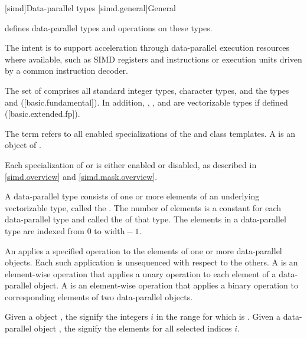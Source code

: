 [simd]{Data-parallel types}
[simd.general]{General}

\pnum
[simd] defines data-parallel types and operations on these types.
\begin{note}
The intent is to support acceleration through data-parallel execution resources
where available, such as SIMD registers and instructions or execution units
driven by a common instruction decoder.
\end{note}

\pnum\label{wording.vectorizable.types}%
The set of  comprises all standard integer types,
character types, and the types  and 
([basic.fundamental]).
In addition, , , and
 are vectorizable types if defined ([basic.extended.fp]).

\pnum
The term  refers to all enabled specializations of
the  and  class templates. A  is
an object of .

\pnum
Each specialization of  or  is either enabled or disabled,
as described in \ref{simd.overview} and \ref{simd.mask.overview}.

\pnum
A data-parallel type consists of one or more elements of an underlying vectorizable type,
called the .
The number of elements is a constant for each data-parallel type and called the
 of that type.
The elements in a data-parallel type are indexed from 0 to $\textrm{width} - 1$.

\pnum
An  applies a specified operation to the elements of one or more
data-parallel objects. Each such application is unsequenced with respect to the others. A
 is an element-wise operation that applies a unary operation to
each element of a data-parallel object. A  is an element-wise
operation that applies a binary operation to corresponding elements of two data-parallel objects.

\pnum\label{wording.selected.indices}%
Given a  object , the
 signify the integers $i$ in the range
 for which  is .
Given a data-parallel object , the  signify the elements
 for all selected indices $i$.

